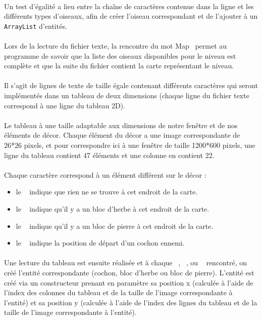 \documentclass[a4paper,12pt]{report}
\begin{document}
\paragraph{}Un test d’égalité a lieu entre la chaîne de caractères contenue dans la ligne et les différents types d’oiseaux, afin de créer l’oiseau correspondant et de l’ajouter à un \verb+ArrayList+ d’entités.
\paragraph{}Lors de la lecture du fichier texte, la rencontre du mot \guillemotleft Map\guillemotright~ permet au programme de savoir que la liste des oiseaux disponibles pour le niveau est complète et que la suite du fichier contient la carte représentant le niveau.
\paragraph{}Il s’agit de lignes de texte de taille égale contenant différents caractères qui seront implémentés dans un tableau de deux dimensions (chaque ligne du fichier texte correspond à une ligne du tableau 2D).
\paragraph{}Le tableau à une taille adaptable aux dimensions de notre fenêtre et de nos éléments de décor. Chaque élément du décor a une image correspondante de 26*26 pixels, et pour correspondre ici à une fenêtre de taille 1200*600 pixels, une ligne du tableau contient 47 éléments et une colonne en contient 22.
\paragraph{}Chaque caractère correspond à un élément différent sur le décor :
\begin{itemize}
\item le \guillemotright~ indique que rien ne se trouve à cet endroit de la carte.
\item le \guillemotright~ indique qu’il y a un bloc d’herbe à cet endroit de la carte.
\item le \guillemotright~ indique qu’il y a un bloc de pierre à cet endroit de la carte.
\item le \guillemotright~ indique la position de départ d’un cochon ennemi.
\end{itemize}
\paragraph{}Une lecture du tableau est ensuite réalisée et à chaque \guillemotright~, \guillemotright~, ou \guillemotright~ rencontré, on créé l'entité correspondante (cochon, bloc d'herbe ou bloc de pierre). L'entité est créé via un constructeur prenant en paramètre sa position x (calculée à l'aide de l'index des colonnes du tableau et de la taille de l'image correspondante à l'entité) et sa position y (calculée à l'aide de l'index des lignes du tableau et de la taille de l'image correspondante à l'entité).
\end{document}
